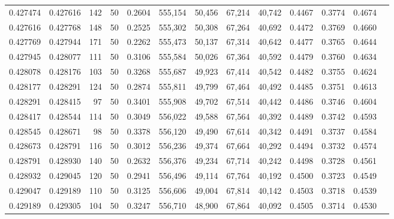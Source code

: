\begin{tabular}{rrrrrrrrrrrrr}
0.427474 & 0.427616 &   142 &  50 &                                     0.2604 & 555,154 &  50,456 &  67,214 &  40,742 & 0.4467 & 0.3774 & 0.4674 \\
0.427616 & 0.427768 &   148 &  50 &                                     0.2525 & 555,302 &  50,308 &  67,264 &  40,692 & 0.4472 & 0.3769 & 0.4660 \\
0.427769 & 0.427944 &   171 &  50 &                                     0.2262 & 555,473 &  50,137 &  67,314 &  40,642 & 0.4477 & 0.3765 & 0.4644 \\
0.427945 & 0.428077 &   111 &  50 &                                     0.3106 & 555,584 &  50,026 &  67,364 &  40,592 & 0.4479 & 0.3760 & 0.4634 \\
0.428078 & 0.428176 &   103 &  50 &                                     0.3268 & 555,687 &  49,923 &  67,414 &  40,542 & 0.4482 & 0.3755 & 0.4624 \\
0.428177 & 0.428291 &   124 &  50 &                                     0.2874 & 555,811 &  49,799 &  67,464 &  40,492 & 0.4485 & 0.3751 & 0.4613 \\
0.428291 & 0.428415 &    97 &  50 &                                     0.3401 & 555,908 &  49,702 &  67,514 &  40,442 & 0.4486 & 0.3746 & 0.4604 \\
0.428417 & 0.428544 &   114 &  50 &                                     0.3049 & 556,022 &  49,588 &  67,564 &  40,392 & 0.4489 & 0.3742 & 0.4593 \\
0.428545 & 0.428671 &    98 &  50 &                                     0.3378 & 556,120 &  49,490 &  67,614 &  40,342 & 0.4491 & 0.3737 & 0.4584 \\
0.428673 & 0.428791 &   116 &  50 &                                     0.3012 & 556,236 &  49,374 &  67,664 &  40,292 & 0.4494 & 0.3732 & 0.4574 \\
0.428791 & 0.428930 &   140 &  50 &                                     0.2632 & 556,376 &  49,234 &  67,714 &  40,242 & 0.4498 & 0.3728 & 0.4561 \\
0.428932 & 0.429045 &   120 &  50 &                                     0.2941 & 556,496 &  49,114 &  67,764 &  40,192 & 0.4500 & 0.3723 & 0.4549 \\
0.429047 & 0.429189 &   110 &  50 &                                     0.3125 & 556,606 &  49,004 &  67,814 &  40,142 & 0.4503 & 0.3718 & 0.4539 \\
0.429189 & 0.429305 &   104 &  50 &                                     0.3247 & 556,710 &  48,900 &  67,864 &  40,092 & 0.4505 & 0.3714 & 0.4530 \\

\end{tabular}
